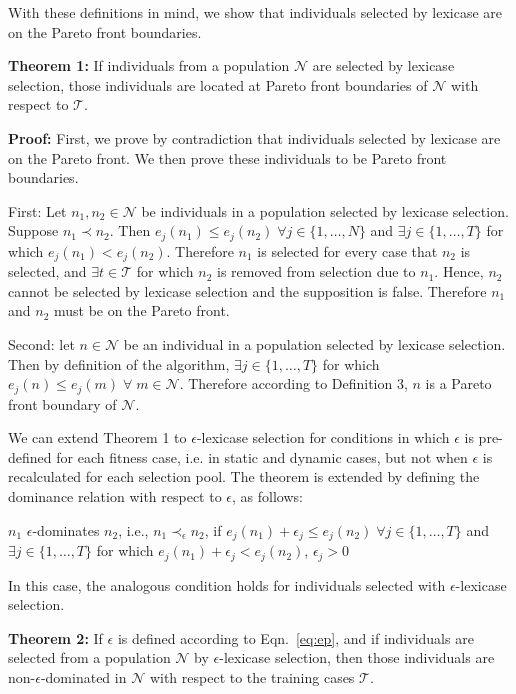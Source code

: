 \documentclass[preprint]{article}
\begin{document}
With these definitions in mind, we show that individuals selected by lexicase are on the Pareto front boundaries. 

\medskip
\noindent \textbf{Theorem 1:} If individuals from a population $\mathcal{N}$ are selected by lexicase selection, those individuals are located at Pareto front boundaries of $\mathcal{N}$ with respect to $\mathcal{T}$. 
\medskip

\noindent \textbf{Proof:} First, we prove by contradiction that individuals selected by lexicase are on the Pareto front. We then prove these individuals to be Pareto front boundaries. 

First: Let $n_1, n_2 \in \mathcal{N}$ be individuals in a population selected by lexicase selection. Suppose $n_1 \prec n_2$. Then $e_j(n_1) \leq e_j(n_2) \;
\forall j  \in \{1,\dots,N\}$ and $\exists j \in \{1,\dots,T\}$ for which $e_j(n_1) < e_j(n_2)$. Therefore $n_1$ is selected for every case that $n_2$ is selected, and $\exists t \in \mathcal{T}$ for which $n_2$ is removed from selection due to $n_1$. Hence, $n_2$ cannot be selected by lexicase selection and the supposition is false. Therefore $n_1$ and $n_2$ must be on the Pareto front. 

Second: let $n \in \mathcal{N}$ be an individual in a population selected by lexicase selection. Then by definition of the algorithm, $\exists j \in \{1,\dots,T\}$ for which $e_j(n) \leq e_j(m) \; \forall \; m \in \mathcal{N}$. Therefore according to Definition 3, $n$ is a Pareto front boundary of $\mathcal{N}$.  
\bigskip


We can extend Theorem 1 to $\epsilon$-lexicase selection for conditions in which $\epsilon$ is pre-defined for each fitness case, i.e. in static and dynamic cases, but not when $\epsilon$ is recalculated for each selection pool. The theorem is extended by defining the dominance relation with respect to $\epsilon$, as follows:


\medskip
{} $n_1$ $\epsilon$-dominates $n_2$, i.e., ${n_1} \prec_{\epsilon} {n_2}$, if $e_j(n_1) + \epsilon_j \leq e_j(n_2)  \;
\forall j  \in \{1,\dots,T\}$ and $\exists j \in \{1,\dots,T\}$ for which $e_j(n_1) + \epsilon_j < e_j(n_2) $, $\epsilon_j>0$\bigskip
\bigskip

In this case, the analogous condition holds for individuals selected with $\epsilon$-lexicase selection. 

\medskip
\noindent \textbf{Theorem 2:} If $\epsilon$ is defined according to Eqn.~\ref{eq:ep}, and if individuals are selected from a population $\mathcal{N}$ by $\epsilon$-lexicase selection, then those individuals are non-$\epsilon$-dominated in $\mathcal{N}$ with respect to the training cases $\mathcal{T}$. 
\medskip
\end{document}
